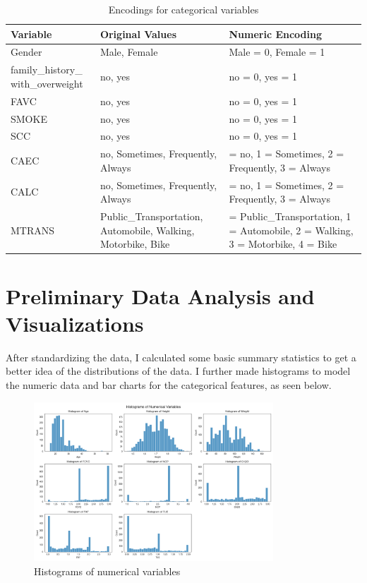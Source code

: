 \documentclass[a4paper,12pt]{article}
\begin{document}
\begin{table}[H]
\centering
\footnotesize
\begin{tabular}{>{\raggedright\arraybackslash}p{3.5cm} >{\raggedright\arraybackslash}p{5.5cm} >{\raggedright\arraybackslash}p{4.2cm}}
\toprule
\textbf{Variable} & \textbf{Original Values} & \textbf{Numeric Encoding} \\
\midrule
Gender & Male, Female & Male = 0, Female = 1 \\
family\_history\_
with\_overweight & no, yes & no = 0, yes = 1 \\
FAVC & no, yes & no = 0, yes = 1 \\
SMOKE & no, yes & no = 0, yes = 1 \\
SCC & no, yes & no = 0, yes = 1 \\
CAEC & no, Sometimes, Frequently, Always & 0 = no, 1 = Sometimes, 2 = Frequently, 3 = Always \\
CALC & no, Sometimes, Frequently, Always & 0 = no, 1 = Sometimes, 2 = Frequently, 3 = Always \\
MTRANS & Public\_Transportation, Automobile, Walking, Motorbike, Bike & 0 = Public\_Transportation, 1 = Automobile, 2 = Walking, 3 = Motorbike, 4 = Bike \\
\bottomrule
\end{tabular}
\caption{Encodings for categorical variables}
\label{tab:encodings}
\end{table}

\section{Preliminary Data Analysis and Visualizations}

After standardizing the data, I calculated some basic summary statistics to get a better idea of the distributions of the data. I further made histograms to model the numeric data and bar charts for the categorical features, as seen below.

\begin{figure}[H]
    \centering
    \includegraphics[width=0.8\textwidth]{Histograms.png}
    \caption{Histograms of numerical variables}
    \label{fig:histograms}
\end{figure}
\end{document}

